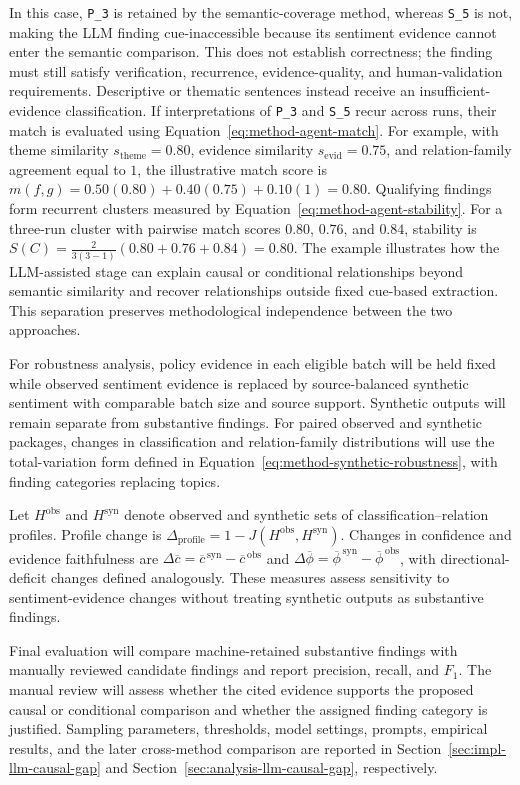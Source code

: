{In this case, \texttt{P\_3} is retained by the semantic-coverage method, whereas
\texttt{S\_5} is not, making the LLM finding cue-inaccessible because its sentiment
evidence cannot enter the semantic comparison. This does not establish correctness;
the finding must still satisfy verification, recurrence, evidence-quality, and
human-validation requirements. Descriptive or thematic sentences instead receive an
insufficient-evidence classification. If interpretations of \texttt{P\_3} and
\texttt{S\_5} recur across runs, their match is evaluated using
Equation~\ref{eq:method-agent-match}. For example, with theme similarity
\(s_{\mathrm{theme}}=0.80\), evidence similarity
\(s_{\mathrm{evid}}=0.75\), and relation-family agreement equal to \(1\), the
illustrative match score is
\(m(f,g)=0.50(0.80)+0.40(0.75)+0.10(1)=0.80\).
Qualifying findings form recurrent clusters measured by
Equation~\ref{eq:method-agent-stability}. For a three-run cluster with pairwise
match scores \(0.80\), \(0.76\), and \(0.84\), stability is
\(S(C)=\frac{2}{3(3-1)}(0.80+0.76+0.84)=0.80\).
The example illustrates how the LLM-assisted stage can explain causal or conditional
relationships beyond semantic similarity and recover relationships outside fixed
cue-based extraction. This separation preserves methodological independence between
the two approaches. 

For robustness analysis, policy evidence in each eligible batch will be held fixed
while observed sentiment evidence is replaced by source-balanced synthetic sentiment
with comparable batch size and source support. Synthetic outputs will remain separate
from substantive findings. For paired observed and synthetic packages, changes in
classification and relation-family distributions will use the total-variation form
defined in Equation~\ref{eq:method-synthetic-robustness}, with finding categories
replacing topics.

Let $H^{\mathrm{obs}}$ and $H^{\mathrm{syn}}$ denote observed and synthetic sets of
classification--relation profiles. Profile change is
$\Delta_{\mathrm{profile}}=1-J(H^{\mathrm{obs}},H^{\mathrm{syn}})$. Changes in
confidence and evidence faithfulness are
$\Delta\overline{c}=\overline{c}^{\,\mathrm{syn}}-\overline{c}^{\,\mathrm{obs}}$ and
$\Delta\overline{\phi}=\overline{\phi}^{\,\mathrm{syn}}-\overline{\phi}^{\,\mathrm{obs}}$,
with directional-deficit changes defined analogously. These measures assess
sensitivity to sentiment-evidence changes without treating synthetic outputs as
substantive findings.

Final evaluation will compare machine-retained substantive findings with manually
reviewed candidate findings and report precision, recall, and $F_1$. The manual
review will assess whether the cited evidence supports the proposed causal or
conditional comparison and whether the assigned finding category is justified.
Sampling parameters, thresholds, model settings, prompts, empirical results, and the
later cross-method comparison are reported in Section~\ref{sec:impl-llm-causal-gap}
and Section~\ref{sec:analysis-llm-causal-gap}, respectively.}


